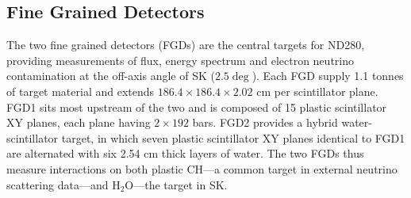 \subsection{Fine Grained Detectors}
The two fine grained detectors (FGDs)\cite{t2k_fgd} are the central targets for ND280, providing measurements of flux, energy spectrum and electron neutrino contamination at the off-axis angle of SK ($2.5\deg$). Each FGD supply 1.1 tonnes of target material and extends $186.4\times186.4\times2.02\text{ cm}$ per scintillator plane. FGD1 sits most upstream of the two and is composed of 15 plastic scintillator XY planes, each plane having $2\times192$ bars. FGD2 provides a hybrid water-scintillator target, in which seven plastic scintillator XY planes identical to FGD1 are alternated with six 2.54 cm thick layers of water. The two FGDs thus measure interactions on both plastic CH---a common target in external neutrino scattering data---and $\text{H}_2\text{O}$---the target in SK.

